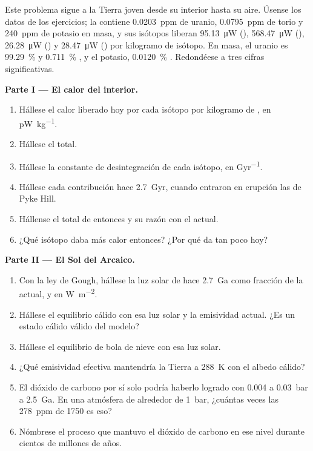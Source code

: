 \begin{problem}\label{pb:b2:precambrian-earth:1}
Este problema sigue a la Tierra joven desde su interior hasta su aire. Úsense los datos de los
ejercicios; la  contiene \qty{0.0203}{ppm} de uranio, \qty{0.0795}{ppm} de
torio y \qty{240}{ppm} de potasio en masa, y sus isótopos liberan \qty{95.13}{\micro W}
(), \qty{568.47}{\micro W} (), \qty{26.28}{\micro W} () y
\qty{28.47}{\micro W} () por kilogramo de isótopo. En masa, el uranio es
\qty{99.29}{\percent}  y \qty{0.711}{\percent} , y el potasio,
\qty{0.0120}{\percent} . Redondéese a tres cifras significativas.

\noindent\textbf{Parte I --- El calor del interior.}
\begin{enumerate}
  \item Hállese el calor liberado hoy por cada isótopo por kilogramo de , en
        \unit{pW.kg^{-1}}.
  \item Hállese el total.
  \item Hállese la constante de desintegración de cada isótopo, en \unit{Gyr^{-1}}.
  \item Hállese cada contribución hace \qty{2.7}{Gyr}, cuando entraron en erupción las  de Pyke Hill.
  \item Hállense el total de entonces y su razón con el actual.
  \item ¿Qué isótopo daba más calor entonces? ¿Por qué da tan poco hoy?
\end{enumerate}

\noindent\textbf{Parte II --- El Sol del Arcaico.}
\begin{enumerate}[resume]
  \item Con la ley de Gough, hállese la luz solar de hace \qty{2.7}{Ga} como fracción de la actual, y en
        \unit{W.m^{-2}}.
  \item Hállese el equilibrio cálido con esa luz solar y la emisividad actual. ¿Es un estado cálido
        válido del modelo?
  \item Hállese el equilibrio de bola de nieve con esa luz solar.
  \item ¿Qué emisividad efectiva mantendría la Tierra a \qty{288}{K} con el albedo cálido?
  \item El dióxido de carbono por sí solo podría haberlo logrado con 0.004 a \qty{0.03}{bar} a \qty{2.5}{Ga}.
        En una atmósfera de alrededor de \qty{1}{bar}, ¿cuántas veces las \qty{278}{ppm} de 1750 es
        eso?
  \item Nómbrese el proceso que mantuvo el dióxido de carbono en ese nivel durante cientos de millones
        de años.
\end{enumerate}


\end{problem}
